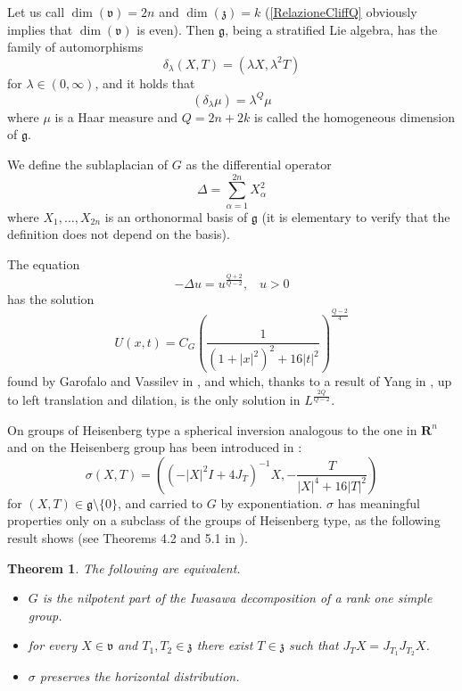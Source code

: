 \documentclass{article}
\newcommand{\g}[1]{\mathfrak{#1}}
\newcommand{\alfa}{\alpha}
\newcommand{\R}{\mathbf{R}}
\newcommand{\mi}{\mu}
\newtheorem{teorema}[proposizione]{Theorem}
\theoremstyle{definition}
\theoremstyle{remark}
\begin{document}
Let us call $\dim(\g{v})=2n$ and $\dim(\g{z})=k$ (\eqref{RelazioneCliffQ} obviously implies that $\dim(\g{v})$ is even).
Then $\g{g}$, being a stratified Lie algebra, has the family of automorphisms
$$\delta_{\lambda}(X,T) = (\lambda X,\lambda^2T)$$
for $\lambda\in(0,\infty)$, and it holds that
$$(\delta_{\lambda}\mi) = \lambda^Q\mi$$
where $\mi$ is a Haar measure and $Q=2n+2k$ is called the homogeneous dimension of $\g{g}$.

We define the sublaplacian of $G$ as the differential operator
$$\Delta = \sum_{\alfa=1}^{2n}X_{\alfa}^2$$
where $X_1,\ldots,X_{2n}$ is an orthonormal basis of $\g{g}$ (it is elementary to verify that the definition does not depend on the basis).

The equation
$$-\Delta u = u^{\frac{Q+2}{Q-2}} ,\;\;\; u>0$$
has the solution
\begin{equation}\label{SoluzioneGarofaloLanconelli}
 U(x,t) = C_G\left(\frac{1}{(1+|x|^2)^2 + 16|t|^2}\right)^{\frac{Q-2}{4}}
\end{equation}
found by Garofalo and Vassilev in \cite{GV}, and which, thanks to a result of Yang in \cite{Y}, up to left translation and dilation, is the only solution in $L^{\frac{2Q}{Q-2}}$.

On groups of Heisenberg type a spherical inversion analogous to the one in $\R^n$ and on the Heisenberg group has been introduced in \cite{CDKR}:
\begin{equation}\label{DefinizioneInversione}
 \sigma(X,T) = \left(\left(-|X|^2I + 4J_T\right)^{-1}X , -\frac{T}{|X|^4+16|T|^2}\right)
\end{equation}
for $(X,T)\in\g{g}\setminus\{0\}$, and carried to $G$ by exponentiation.
$\sigma$ has meaningful properties only on a subclass of the groups of Heisenberg type, as the following result shows (see Theorems 4.2 and 5.1 in \cite{CDKR}).

\begin{teorema}\label{TeoremaIwasawa}
 The following are equivalent.
 \begin{itemize}
  \item $G$ is the nilpotent part of the Iwasawa decomposition of a rank one simple group.
  \item for every $X\in\g{v}$ and $T_1,T_2\in\g{z}$ there exist $T\in\g{z}$ such that $J_TX=J_{T_1}J_{T_2}X$.
  \item $\sigma$ preserves the horizontal distribution.
 \end{itemize}
\end{teorema}
\end{document}
